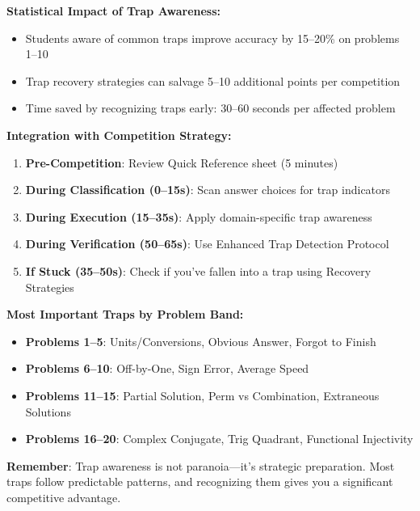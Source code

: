 \documentclass{article}
\begin{document}
\begin{tcolorbox}[colback=green!5!white,colframe=green!75!black,title={\textbf{Key Takeaways for Trap Avoidance}}]
\textbf{Statistical Impact of Trap Awareness:}
\begin{itemize}[nosep]
\item Students aware of common traps improve accuracy by 15--20\% on problems 1--10
\item Trap recovery strategies can salvage 5--10 additional points per competition
\item Time saved by recognizing traps early: 30--60 seconds per affected problem
\end{itemize}

\textbf{Integration with Competition Strategy:}
\begin{enumerate}[nosep]
\item \textbf{Pre-Competition}: Review Quick Reference sheet (5 minutes)
\item \textbf{During Classification (0--15s)}: Scan answer choices for trap indicators
\item \textbf{During Execution (15--35s)}: Apply domain-specific trap awareness
\item \textbf{During Verification (50--65s)}: Use Enhanced Trap Detection Protocol
\item \textbf{If Stuck (35--50s)}: Check if you've fallen into a trap using Recovery Strategies
\end{enumerate}

\textbf{Most Important Traps by Problem Band:}
\begin{itemize}[nosep]
\item \textbf{Problems 1--5}: Units/Conversions, Obvious Answer, Forgot to Finish
\item \textbf{Problems 6--10}: Off-by-One, Sign Error, Average Speed
\item \textbf{Problems 11--15}: Partial Solution, Perm vs Combination, Extraneous Solutions
\item \textbf{Problems 16--20}: Complex Conjugate, Trig Quadrant, Functional Injectivity
\end{itemize}

\textbf{Remember}: Trap awareness is not paranoia—it's strategic preparation. Most traps follow predictable patterns, and recognizing them gives you a significant competitive advantage.
\end{tcolorbox}

\newpage

\end{document}
